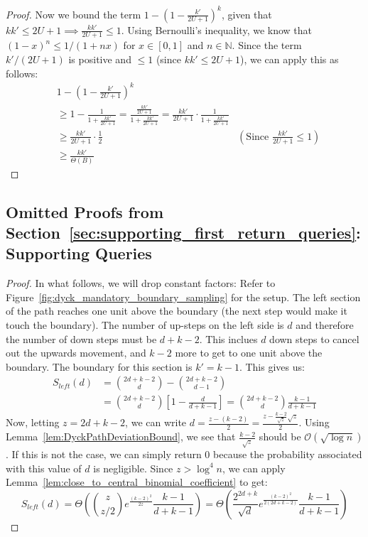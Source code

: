 \DTotalNearBoundary*
\begin{proof}
Now we bound the term $1-\left(1-\frac{k'}{2U+1}\right)^k$, given that $kk'\le 2U+1\implies\frac{kk'}{2U+1} \le 1$.
Using Bernoulli's inequality, we know that $(1 - x)^n \le 1/(1+nx)$ for $x\in [0, 1]$ and $n\in \mathbb N$.
Since the term $k'/(2U+1)$ is positive and $\le 1$ (since $kk' \le 2U+1$), we can apply this as follows:
\begin{align}
&1 - \left(1 - \frac{k'}{2U+1}\right)^k\\
&\ge 1 - \frac{1}{1 + \frac{kk'}{2U+1} } = \frac{\frac{kk'}{2U+1}}{1 + \frac{kk'}{2U+1} } = \frac{kk'}{2U+1}\cdot \frac{1}{1 + \frac{kk'}{2U+1}} \\
&\ge \frac{kk'}{2U+1}\cdot \frac{1}{2} &\left( \textrm{Since }\frac{kk'}{2U+1}\le 1\right) \\
&\ge \frac{kk'}{\Theta(B)}
\end{align}
\end{proof}



\subsection{Omitted Proofs from Section~\ref{sec:supporting_first_return_queries}: Supporting  Queries}
\label{sec:omitted_supporting_first_return_queries}

\ReturnDLeftBound*
\begin{proof}
In what follows, we will drop constant factors:
Refer to Figure~\ref{fig:dyck_mandatory_boundary_sampling} for the setup.
The left section of the path reaches one unit above the boundary (the next step would make it touch the boundary).
The number of up-steps on the left side is $d$ and therefore the number of down steps must be $d + k - 2$.
This inclues $d$ down steps to cancel out the upwards movement, and $k-2$ more to get to one unit above the boundary.
The boundary for this section is $k' = k-1$. This gives us:
\begin{align}
S_{left}(d) &= \binom{2d+k-2}{d} - \binom{2d+k-2}{d-1}\\
&= \binom{2d+k-2}{d}\left[ 1-\frac{d}{d+k-1}\right] = \binom{2d+k-2}{d}\frac{k-1}{d+k-1}
\end{align}
Now, letting $z = 2d+k-2$,  we can write $d = \frac{z-(k-2)}{2} = \frac{z-\frac{k-2}{\sqrt z}\sqrt z}{2}$.
Using Lemma~\ref{lem:DyckPathDeviationBound}, we see that $\frac{k-2}{\sqrt z}$ should be $\mathcal O(\sqrt{\log n})$.
If this is not the case, we can simply return $0$ because the probability associated with this value of $d$ is negligible.
Since $z > \log^4 n$, we can apply Lemma~\ref{lem:close_to_central_binomial_coefficient} to get:
\[
S_{left}(d) = \Theta\left( \binom{z}{z/2} e^{\frac{(k-2)^2}{2z}} \frac{k-1}{d+k-1} \right)
= \Theta\left( \frac{2^{2d+k}}{\sqrt d} e^{\frac{(k-2)^2}{2(2d+k-2)}} \frac{k-1}{d+k-1} \right)
\]
\end{proof}


